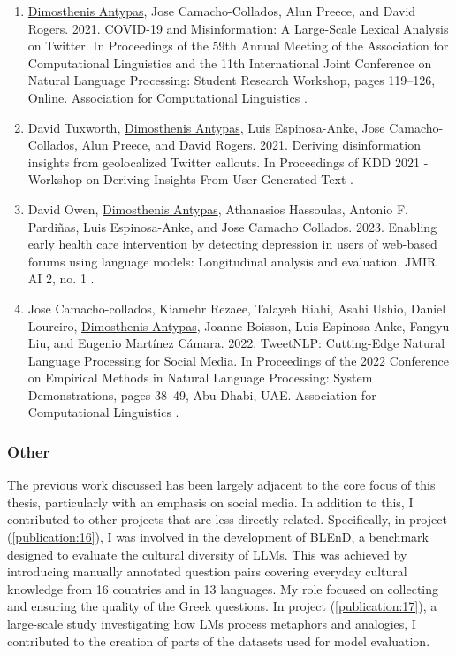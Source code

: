 \begin{enumerate}[start=12]
    \item \label{publication:12} \underline{Dimosthenis Antypas}, Jose Camacho-Collados, Alun Preece, and David Rogers. 2021. COVID-19 and Misinformation: A Large-Scale Lexical Analysis on Twitter. In Proceedings of the 59th Annual Meeting of the Association for Computational Linguistics and the 11th International Joint Conference on Natural Language Processing: Student Research Workshop, pages 119–126, Online. Association for Computational Linguistics \cite{antypas-etal-2021-covid}.
    
    \item \label{publication:13} David Tuxworth, \underline{Dimosthenis Antypas}, Luis Espinosa-Anke, Jose Camacho-Collados, Alun Preece, and David Rogers. 2021. Deriving disinformation insights from geolocalized Twitter callouts. In Proceedings of KDD 2021 - Workshop on Deriving Insights From User-Generated Text \cite{tuxworth2021disinformation}.

    \item \label{publication:14} David Owen, \underline{Dimosthenis Antypas}, Athanasios Hassoulas, Antonio F. Pardiñas, Luis Espinosa-Anke, and Jose Camacho Collados. 2023. Enabling early health care intervention by detecting depression in users of web-based forums using language models: Longitudinal analysis and evaluation. JMIR AI 2, no. 1 \cite{owen2023enabling}.
    
    \item \label{publication:15} Jose Camacho-collados, Kiamehr Rezaee, Talayeh Riahi, Asahi Ushio, Daniel Loureiro, \underline{Dimosthenis Antypas}, Joanne Boisson, Luis Espinosa Anke, Fangyu Liu, and Eugenio Martínez Cámara. 2022. TweetNLP: Cutting-Edge Natural Language Processing for Social Media. In Proceedings of the 2022 Conference on Empirical Methods in Natural Language Processing: System Demonstrations, pages 38–49, Abu Dhabi, UAE. Association for Computational Linguistics \cite{camacho2022tweetnlp}.
\end{enumerate}


\subsubsection{Other }
The previous work discussed has been largely adjacent to the core focus of this thesis, particularly with an emphasis on social media. In addition to this, I contributed to other projects that are less directly related. Specifically, in project (\ref{publication:16}), I was involved in the development of BLEnD, a benchmark designed to evaluate the cultural diversity of \acp{LLM}. This was achieved by introducing manually annotated question pairs covering everyday cultural knowledge from 16 countries and in 13 languages. My role focused on collecting and ensuring the quality of the Greek questions. In project (\ref{publication:17}), a large-scale study investigating how \acp{LM} process metaphors and analogies, I contributed to the creation of parts of the datasets used for model evaluation.


